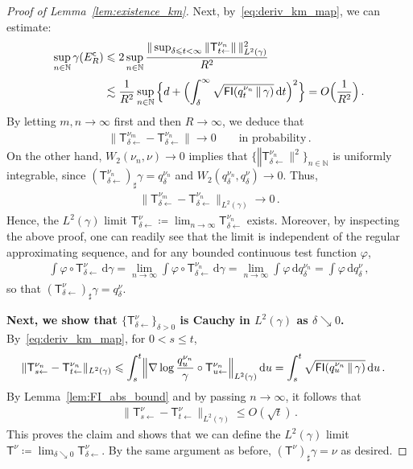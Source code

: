 \documentclass[12pt]{article}
\newcommand{\N}{\mathbb{N}}
\newcommand{\1}{\mathds{1}}
\newcommand*{\rd}{\mathrm{d}}
\newcommand*{\dd}{\, \rd}
\renewcommand{\phi}{\varphi}
\newcommand{\mmid}{\,\Vert\,}
\newcommand{\deq}{\coloneqq}
\DeclareMathOperator*{\FI}{\mathsf{FI}}
\newcommand{\comp}{\mathsf c}
\renewcommand{\le}{\leqslant}
\newcommand{\KM}{\mathsf T}
\theoremstyle{plain}
\theoremstyle{definition}
\theoremstyle{remark}
\begin{document}
\begin{proof}[Proof of Lemma~\ref{lem:existence_km}]
    Next, by~\eqref{eq:deriv_km_map}, we can estimate:
    \begin{align*}
        \sup_{n\in\N} \gamma(E_R^\comp)
        &\le 2\sup_{n\in\N} \frac{\|\sup_{\delta\le t <\infty}{\|\KM_{t\gets}^{\nu_n}}\|\,\|_{L^2(\gamma)}^2}{R^2}\\[0.25em]
        &\lesssim \frac{1}{R^2} \sup_{n\in\N}{\Bigl\{d + \Bigl(\int_\delta^\infty \sqrt{\FI(q_t^{\nu_n}\mmid \gamma)}\dd t \Bigr)^2 \Bigr\}}
        = O\Bigl(\frac{1}{R^2}\Bigr)\,.
    \end{align*}
    By letting $m,n\to\infty$ first and then $R \to \infty$, we deduce that
    \begin{align*}
        \|\mathsf T^{\nu_{m}}_{\delta\gets} - \mathsf T^{\nu_{n}}_{\delta \gets}\|\to 0 \qquad\text{in probability}\,.
    \end{align*}
    On the other hand, $W_2(\nu_n,\nu) \to 0$ implies that $\{\mathsf \|\KM^{\nu_n}_{\delta\gets}\|^2\}_{n\in\N}$ is uniformly integrable, since $(\KM^{\nu_n}_{\delta\gets})_\sharp \gamma = q_\delta^{\nu_n}$ and $W_2(q_\delta^{\nu_n}, q_\delta^\nu) \to 0$. Thus,
    \begin{align*}
        \|\mathsf T^{\nu_m}_{\delta\gets} - \mathsf T^{\nu_{n}}_{\delta\gets}\|_{L^2(\gamma)}\to 0\,.
    \end{align*}
    Hence, the $L^2(\gamma)$ limit $\KM^\nu_{\delta\gets} \deq \lim_{n\to\infty} \KM^{\nu_n}_{\delta\gets}$ exists.
    Moreover, by inspecting the above proof, one can readily see that the limit is independent of the regular approximating sequence, and for any bounded continuous test function $\phi$,
    \begin{align*}
        \int \phi\circ \KM^\nu_{\delta\gets}\dd \gamma = \lim_{n\to\infty} \int \phi\circ\KM^{\nu_n}_{\delta\gets}\dd\gamma
        = \lim_{n\to\infty} \int \phi\dd q_\delta^{\nu_n} = \int \phi\dd q_\delta^\nu\,,
    \end{align*}
    so that $(\KM^\nu_{\delta\gets})_\sharp \gamma = q_\delta^\nu$.

    \textbf{Next, we show that $\{\KM^\nu_{\delta\gets}\}_{\delta > 0}$ is Cauchy in $L^2(\gamma)$ as $\delta \searrow 0$.}
    By~\eqref{eq:deriv_km_map}, for $0 < s \le t$,
    \begin{align*}
        \|\mathsf T^{\nu_n}_{s\gets} - \mathsf T^{\nu_n}_{t\gets}\|_{L^2(\gamma)}
        &\le \int_s^t \Bigl\lVert\nabla \log \frac{q_u^{\nu_n}}{\gamma} \circ \KM_{u\gets}^{\nu_n}\Bigr\rVert_{L^2(\gamma)}\dd u
        = \int_s^t \sqrt{\FI(q_u^{\nu_n} \mmid \gamma)}\dd u\,.
    \end{align*}
    By Lemma~\ref{lem:FI_abs_bound} and by passing $n\to\infty$, it follows that
    \begin{align*}
        \|\mathsf T^{\nu}_{s\gets} - \mathsf T^{\nu}_{t\gets}\|_{L^2(\gamma)}
        \le O(\sqrt t)\,.
    \end{align*}
    This proves the claim and shows that we can define the $L^2(\gamma)$ limit $\KM^\nu \deq \lim_{\delta\searrow 0} \KM^\nu_{\delta\gets}$.
    By the same argument as before, $(\KM^\nu)_\sharp \gamma = \nu$ as desired.
\end{proof}
\end{document}
